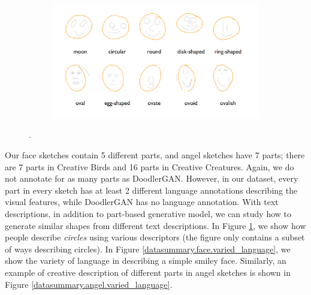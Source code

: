 \begin{figure}[!htb]
\begin{subfigure}{\textwidth}
\centering
\includegraphics[width=\linewidth]{data_collection/summary/circles_descriptions.png}  
\end{subfigure}
\caption{.}
\label{datasummary.circles.varied_language}
\end{figure}

Our face sketches contain 5 different parts, and angel sketches have 7 parts; there are 7 parts in Creative Birds and 16 parts in Creative Creatures. Again, we do not annotate for as many parts as DoodlerGAN. 
However, in our dataset, every part in every sketch has at least 2 different language annotations describing the visual features, while DoodlerGAN has no language annotation. 
With text descriptions, in addition to part-based generative model, we can study how to generate similar shapes from different text descriptions. In Figure \ref{datasummary.circles.varied_language}, we show how people describe \textit{circles} using various descriptors (the figure only contains a subset of ways describing circles).  
In Figure \ref{datasummary.face.varied_language}, we show the variety of language in describing a simple smiley face. Similarly, an example of creative description of different parts in angel sketches is shown in Figure \ref{datasummary.angel.varied_language}.  


